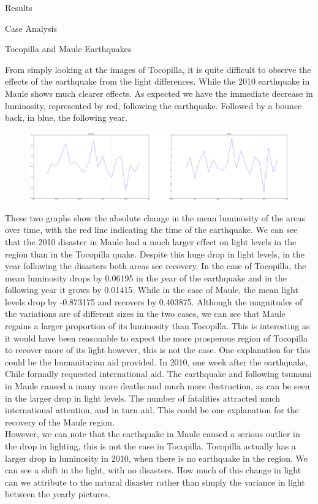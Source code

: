 \documentclass[12.5pt,fleqn,leqno,letterpaper]{article}
\begin{document}
\begin{section}{Results}
\begin{subsection}{Case Analysis}
\begin{subsubsection}{Tocopilla and Maule Earthquakes}
\begin{figure}[H]
      \end{figure}
      From simply looking at the images of Tocopilla, it is quite difficult to observe the effects of the earthquake from the light differences. While the 2010 earthquake in Maule shows much clearer effects. As expected we have the immediate decrease in luminosity, represented by red, following the earthquake. Followed by a bounce back, in blue, the following year. \\
      \begin{figure}[H]
        \centering
        \includegraphics[width=1\linewidth]{maule_tocopilla}\label{fig:maule_tocopilla}
      \end{figure}
      These two graphs show the absolute change in the mean luminosity of the areas over time, with the red line indicating the time of the earthquake. We can see that the 2010 disaster in Maule had a much larger effect on light levels in the region than in the Tocopilla quake. Despite this huge drop in light levels, in the year following the disasters both areas see recovery. In the case of Tocopilla, the mean luminosity drops by 0.06195 in the year of the earthquake and in the following year it grows by 0.01415. While in the case of Maule, the mean light levels drop by -0.873175 and recovers by 0.403875. Although the magnitudes of the variations are of different sizes in the two cases, we can see that Maule regains a larger proportion of its luminosity than Tocopilla. This is interesting as it would have been reasonable to expect the more prosperous region of Tocopilla to recover more of its light however, this is not the case. One explanation for this could be the humanitarian aid provided. In 2010, one week after the earthquake, Chile formally requested international aid. The earthquake and following tsunami in Maule caused a many more deaths and much more destruction, as can be seen in the larger drop in light levels. The number of fatalities attracted much international attention, and in turn aid. This could be one explanation for the recovery of the Maule region. \\
      However, we can note that the earthquake in Maule caused a serious outlier in the drop in lighting, this is not the case in Tocopilla. Tocopilla actually has a larger drop in luminosity in 2010, when there is no earthquake in the region. We can see a shift in the light, with no disasters. How much of this change in light can we attribute to the natural disaster rather than simply the variance in light between the yearly pictures.
    \end{subsubsection}


\end{subsection}
\end{section}
\end{document}
